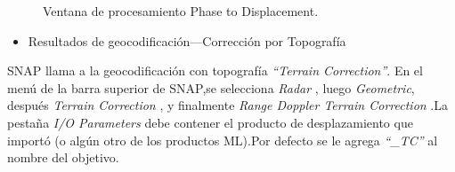 \documentclass{article}
\begin{document}
\begin{figure}[htbp]
\begin{minipage}[b]{0.5\linewidth}
\caption{Ventana de procesamiento Phase to Displacement.}
\label{fig:figura18}
\end{minipage}
\end{figure}

\begin{itemize}
    \item Resultados de geocodificación—Corrección por Topografía
\end{itemize}
SNAP llama a la geocodificación con topografía \textit{“Terrain Correction”}. En el menú de la barra superior de SNAP,se selecciona \textit{Radar} , luego \textit{Geometric}, después \textit{Terrain Correction} , y finalmente \textit{Range Doppler Terrain Correction} .La pestaña \textit{I/O Parameters}  debe contener el producto de desplazamiento que importó (o algún otro de los productos ML).Por defecto se le agrega \textit{“\_TC”} al nombre del  objetivo.     %
\end{document}
